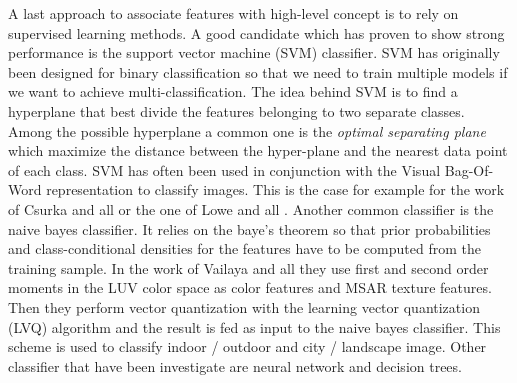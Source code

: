     A last approach to associate features with high-level concept is to rely on supervised learning methods. A good candidate which has proven to show strong performance is the support vector machine (SVM) classifier. SVM has originally been designed for binary classification so that we need to train multiple models if we want to achieve multi-classification. The idea behind SVM is to find a hyperplane that best divide the features belonging to two separate classes. Among the possible hyperplane a common one is the \textit{optimal separating plane} which maximize the distance between the hyper-plane and the nearest data point of each class. SVM has often been used in conjunction with the Visual Bag-Of-Word representation to classify images. This is the case for example for the work of Csurka and all \cite{csurka2004visual} or the one of Lowe and all \cite{lowe2004distinctive}.
    Another common classifier is the naive bayes classifier. It relies on the baye's theorem so that prior probabilities and class-conditional densities for the features have to be computed from the training sample. In the work of Vailaya and all \cite{vailaya2001image} they use first and second order moments in the LUV color space as color features and MSAR texture features. Then they perform vector quantization with the learning vector quantization (LVQ) algorithm and the result is fed as input to the naive bayes classifier. This scheme is used to classify indoor / outdoor and city / landscape image. Other classifier that have been investigate are neural network and decision trees.
